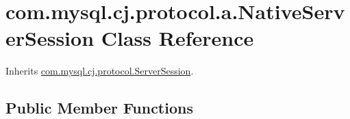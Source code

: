 \hypertarget{classcom_1_1mysql_1_1cj_1_1protocol_1_1a_1_1_native_server_session}{}\section{com.\+mysql.\+cj.\+protocol.\+a.\+Native\+Server\+Session Class Reference}
\label{classcom_1_1mysql_1_1cj_1_1protocol_1_1a_1_1_native_server_session}


Inherits \mbox{\hyperlink{interfacecom_1_1mysql_1_1cj_1_1protocol_1_1_server_session}{com.\+mysql.\+cj.\+protocol.\+Server\+Session}}.

\subsection*{Public Member Functions}
